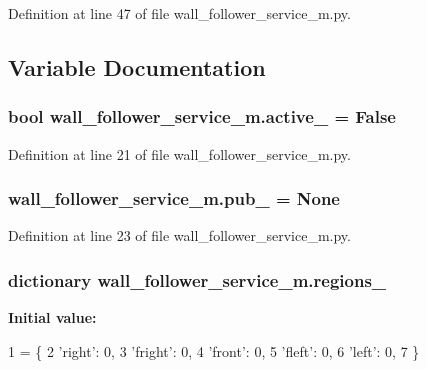 Definition at line 47 of file wall\+\_\+follower\+\_\+service\+\_\+m.\+py.



\subsection{Variable Documentation}
\subsubsection[{\texorpdfstring{active\+\_\+}{active_}}]{\setlength{\rightskip}{0pt plus 5cm}bool wall\+\_\+follower\+\_\+service\+\_\+m.\+active\+\_\+ = False}\hypertarget{namespacewall__follower__service__m_a3808a035405c1350e8af8bf26e364509}{}\label{namespacewall__follower__service__m_a3808a035405c1350e8af8bf26e364509}


Definition at line 21 of file wall\+\_\+follower\+\_\+service\+\_\+m.\+py.

\subsubsection[{\texorpdfstring{pub\+\_\+}{pub_}}]{\setlength{\rightskip}{0pt plus 5cm}wall\+\_\+follower\+\_\+service\+\_\+m.\+pub\+\_\+ = None}\hypertarget{namespacewall__follower__service__m_aa92f44d061ddf4a546602a287ea64d11}{}\label{namespacewall__follower__service__m_aa92f44d061ddf4a546602a287ea64d11}


Definition at line 23 of file wall\+\_\+follower\+\_\+service\+\_\+m.\+py.

\subsubsection[{\texorpdfstring{regions\+\_\+}{regions_}}]{\setlength{\rightskip}{0pt plus 5cm}dictionary wall\+\_\+follower\+\_\+service\+\_\+m.\+regions\+\_\+}\hypertarget{namespacewall__follower__service__m_a326b63f9d570893bead600e2b51cf3a9}{}\label{namespacewall__follower__service__m_a326b63f9d570893bead600e2b51cf3a9}
{\bfseries Initial value\+:}
\begin{DoxyCode}
1 = \{
2     \textcolor{stringliteral}{'right'}: 0,
3     \textcolor{stringliteral}{'fright'}: 0,
4     \textcolor{stringliteral}{'front'}: 0,
5     \textcolor{stringliteral}{'fleft'}: 0,
6     \textcolor{stringliteral}{'left'}: 0,
7 \}
\end{DoxyCode}


